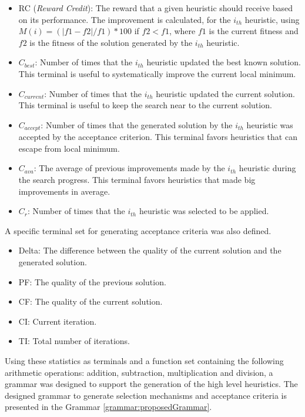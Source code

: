 \documentclass[conference]{IEEEtran}
\begin{document}
\begin{itemize}
	\item RC (\textit{Reward Credit}): The reward that a given heuristic should receive based on its performance. The improvement is calculated, for the $i_{th}$ heuristic, using $M(i) = (|f1 -f2|/f1)*100$ if $f2< f1$, where $f1$ is the current fitness and $f2$ is the fitness of the solution generated by the $i_{th}$ heuristic.
	
 	\item $C_{best}$: Number of times that the $i_{th}$ heuristic updated the best known solution. This terminal is useful to systematically improve the current local minimum.  

	\item $C_{current}$: Number of times that the $i_{th}$ heuristic updated the current solution. This terminal is useful to keep the search near to the current solution.

	\item $C_{accept}$: Number of times that the generated solution 
	by the $i_{th}$ heuristic was accepted by the acceptance criterion. This terminal favors heuristics that can escape from local minimum.

	\item $C_{ava}$: The average of previous improvements made by the $i_{th}$ heuristic during the search progress. This terminal favors heuristics that made big improvements in average.
	\item $C_r$: Number of times that the $i_{th}$ heuristic was selected to be applied.
	
	\end{itemize} 

A specific terminal set for generating acceptance criteria was also defined.

 \begin{itemize}
 	 \item Delta: The difference between the quality of the current solution and the generated solution.
 	\item PF: The quality of the previous solution.
 	\item CF: The quality of the current solution.
 	\item CI: Current iteration.
 	\item TI: Total number of iterations.
 \end{itemize}
	 
  Using these statistics as terminals and a function set containing the following arithmetic operations: addition, subtraction, multiplication and division, a grammar was designed to support the generation of the high level heuristics. The designed grammar to generate selection mechanisms and acceptance criteria is presented in the Grammar \ref{grammar:proposedGrammar}.
  
\end{document}
